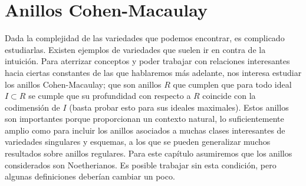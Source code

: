 \chapter{Anillos Cohen-Macaulay}

Dada la complejidad de las variedades que podemos encontrar, es complicado estudiarlas. Existen ejemplos de variedades que suelen ir en contra de la intuición. Para aterrizar conceptos y poder trabajar con relaciones interesantes hacia ciertas constantes de las que hablaremos más adelante, nos interesa estudiar los anillos Cohen-Macaulay; que son anillos $R$ que cumplen que para todo ideal $I \subset R$ se cumple que su profundidad con respecto a $R$ coincide con la codimensión de $I$ (basta probar esto para sus ideales maximales). Estos anillos son importantes porque proporcionan un contexto natural, lo suficientemente amplio como para incluir los anillos asociados a muchas clases interesantes de variedades singulares y esquemas, a los que se pueden generalizar muchos resultados sobre anillos regulares. Para este capítulo asumiremos que los anillos considerados son Noetherianos. Es posible trabajar sin esta condición, pero algunas definiciones deberían cambiar un poco.



